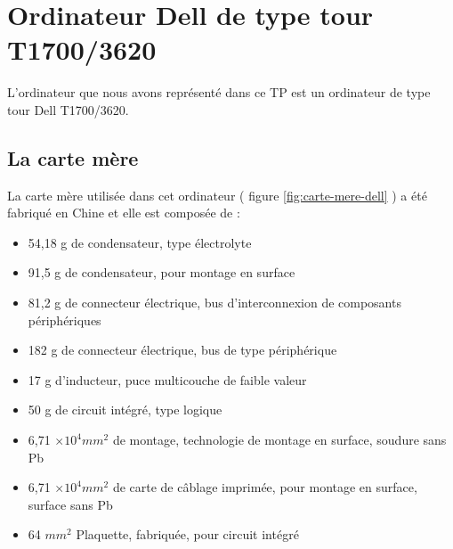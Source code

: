 \section{Ordinateur Dell de type tour T1700/3620}

L'ordinateur que nous avons représenté dans ce TP est un ordinateur de type tour Dell T1700/3620. 


\subsection{La carte mère}

La carte mère utilisée dans cet ordinateur ( figure \ref{fig:carte-mere-dell} ) a été fabriqué en Chine et elle est composée de :
\begin{itemize}
    \item 54,18 g de condensateur, type électrolyte 
    \item 91,5 g de condensateur, pour montage en surface
    \item 81,2 g de connecteur électrique, bus d'interconnexion de composants périphériques
    \item 182 g de connecteur électrique, bus de type périphérique
    \item 17 g d'inducteur, puce multicouche de faible valeur
    \item 50 g de circuit intégré, type logique
    \item 6,71 $\times 10^4 mm^2$ de montage, technologie de montage en surface, soudure sans Pb
    \item 6,71 $\times 10^4 mm^2$ de carte de câblage imprimée, pour montage en surface, surface sans Pb
    \item 64 $mm^2$ Plaquette, fabriquée, pour circuit intégré
\end{itemize}

